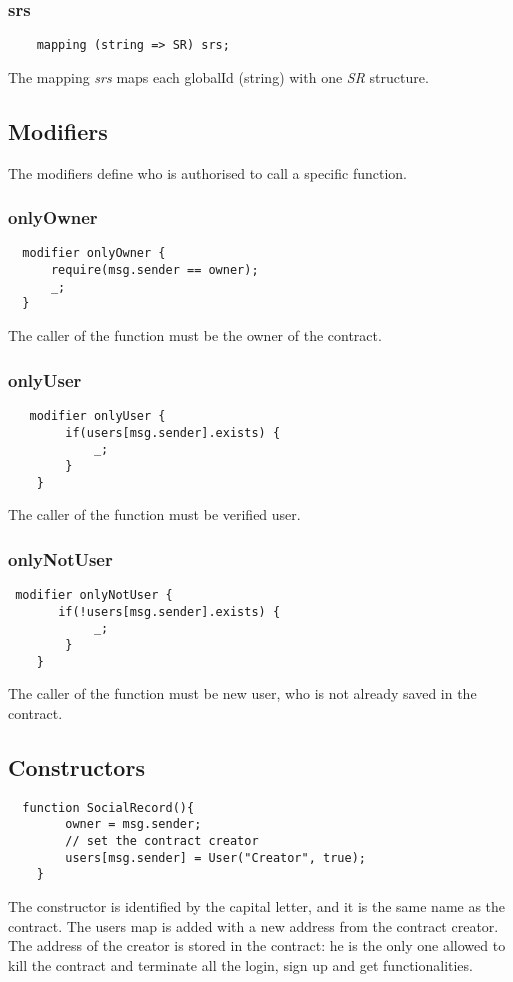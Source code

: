 \subsubsection{srs}
\begin{lstlisting}
    mapping (string => SR) srs;
\end{lstlisting}
The mapping \textit{srs} maps each globalId (string) with one \textit{SR} structure.

\subsection{Modifiers}
The modifiers define who is authorised to call a specific function.

\subsubsection{onlyOwner}
\begin{lstlisting}
  modifier onlyOwner {
      require(msg.sender == owner);
      _;
  }
\end{lstlisting}
The caller of the function must be the owner of the contract.

\subsubsection{onlyUser}
\begin{lstlisting}
   modifier onlyUser {
        if(users[msg.sender].exists) {
            _;
        }
    }
\end{lstlisting}
The caller of the function must be verified user.

\subsubsection{onlyNotUser}
\begin{lstlisting}
 modifier onlyNotUser {
       if(!users[msg.sender].exists) {
            _;
        }
    }
\end{lstlisting}
The caller of the function must be new user, who is not already saved in the contract.

\subsection{Constructors}
\begin{lstlisting}
  function SocialRecord(){
        owner = msg.sender;
        // set the contract creator
        users[msg.sender] = User("Creator", true);
    }
\end{lstlisting}
The constructor is identified by the capital letter, and it is the same name as the contract.
The users map is added with a new address from the contract creator.
The address of the creator is stored in the contract: he is the only one allowed to kill the contract and terminate all the login, sign up and get functionalities.

